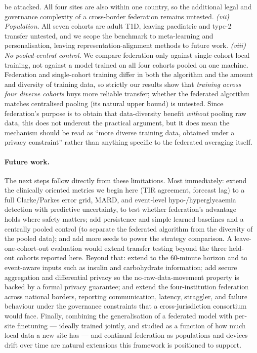 \documentclass[10pt,letterpaper]{article}
\begin{document}
be attacked. All four sites are also within one country, so the additional legal
and governance complexity of a cross-border federation remains untested. \emph{(vii) Population.} All seven cohorts
are adult T1D, leaving paediatric and type-2 transfer untested, and we scope the
benchmark to meta-learning and personalisation, leaving representation-alignment
methods to future work. \emph{(viii) No pooled-central control.} We compare
federation only against single-cohort local training, not against a model trained
on all four cohorts pooled on one machine. Federation and single-cohort training
differ in both the algorithm and the amount and diversity of training data, so
strictly our results show that \emph{training across four diverse cohorts} buys
more reliable transfer; whether the federated algorithm matches centralised
pooling (its natural upper bound) is untested. Since federation's purpose is to
obtain that data-diversity benefit \emph{without} pooling raw data, this does not
undercut the practical argument, but it does mean the mechanism should be read as
``more diverse training data, obtained under a privacy constraint'' rather than
anything specific to the federated averaging itself.

\paragraph{Future work.} The next steps follow directly from these limitations.
Most immediately: extend the clinically oriented metrics we begin here (TIR
agreement, forecast lag) to a full Clarke/Parkes error grid, MARD, and event-level
hypo-/hyperglycaemia detection with predictive uncertainty, to test whether
federation's advantage holds where safety matters; add persistence and simple
learned baselines and a centrally pooled control (to separate the federated
algorithm from the diversity of the pooled data); and add more seeds to power the
strategy comparison. A leave-one-cohort-out evaluation would extend transfer
testing beyond the three held-out cohorts reported here. Beyond that: extend to the
60-minute horizon and to event-aware inputs such as insulin and carbohydrate
information; add secure aggregation and differential privacy so the
no-raw-data-movement property is backed by a formal privacy guarantee; and extend
the four-institution federation across national borders, reporting communication,
latency, straggler, and failure behaviour under the governance constraints that a
cross-jurisdiction consortium would face. Finally, combining the
generalisation of a federated model with per-site finetuning --- ideally trained
jointly, and studied as a function of how much local data a new site has --- and
continual federation as populations and devices drift over time are natural
extensions this framework is positioned to support.



\end{document}
